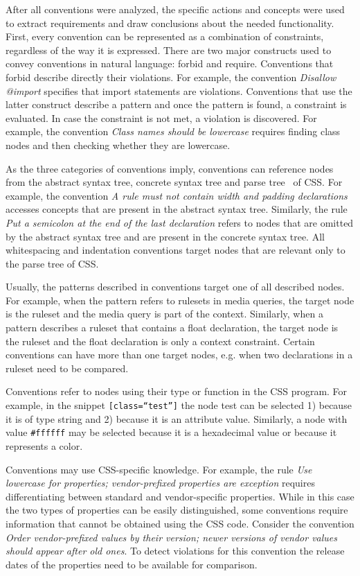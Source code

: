 After all conventions were analyzed, the specific actions and concepts were
used to extract requirements and draw conclusions about the needed
functionality. First, every convention can be represented as a combination of
constraints, regardless of the way it is expressed. There are two major
constructs used to convey conventions in natural language: forbid and require.
Conventions that forbid describe directly their violations. For example, the
convention \textit{Disallow @import} specifies that import statements are
violations. Conventions that use the latter construct describe a pattern and
once the pattern is found, a constraint is evaluated. In case the constraint
is not met, a violation is discovered. For example, the convention
\textit{Class names should be lowercase} requires finding class nodes and then
checking whether they are lowercase.

As the three categories of conventions imply, conventions can reference nodes
from the abstract syntax tree, concrete syntax tree and parse tree~\cite{zaytsev2014parsing} of
CSS. For example, the convention \textit{A rule must
not contain width and padding declarations} accesses concepts that are present
in the abstract syntax tree. Similarly, the rule \textit{Put a semicolon at
the end of the last declaration} refers to nodes that are omitted by the
abstract syntax tree and are present in the concrete syntax tree. All
whitespacing and indentation conventions target nodes that are relevant only
to the parse tree of CSS.

Usually, the patterns described in conventions target one of all described
nodes. For example, when the pattern refers to rulesets in media queries, the
target node is the ruleset and the media query is part of the context.
Similarly, when a pattern describes a ruleset that contains a float
declaration, the target node is the ruleset and the float declaration is only
a context constraint. Certain conventions can have more than one target nodes,
e.g. when two declarations in a ruleset need to be compared.

Conventions refer to nodes using their type or function in the CSS program.
For example, in the snippet \texttt{[class=``test'']} the node test can be
selected 1) because it is of type string and 2) because it is an attribute
value. Similarly, a node with value \texttt{\#ffffff} may be selected because
it is a hexadecimal value or because it represents a color.

Conventions may use CSS-specific knowledge. For example, the rule \textit{Use
lowercase for properties; vendor-prefixed properties are exception} requires
differentiating between standard and vendor-specific properties. While in this
case the two types of properties can be easily distinguished, some conventions
require information that cannot be obtained using the CSS code. Consider the
convention \textit{Order vendor-prefixed values by their version; newer
versions of vendor values should appear after old ones}. To detect violations
for this convention the release dates of the properties need to be available
for comparison.

